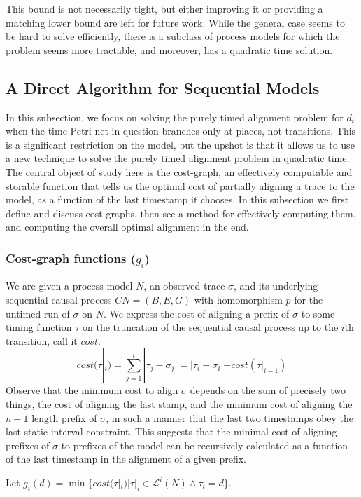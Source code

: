\documentclass[conference]{IEEEtran}
\begin{document}
		This bound is not necessarily tight, but either improving it or providing a matching lower bound are left for future work. 
		While the general case seems to be hard to solve efficiently, there is a subclass of process models for which the problem seems more tractable, and moreover, has a quadratic time solution. 
		

		\subsection{A Direct Algorithm for Sequential Models}\label{mcg}
		In this subsection, we focus on solving the purely timed alignment problem for $d_t$ when the time Petri net in question branches only at places, not transitions. 
		This is a significant restriction on the model, but the upshot is that it allows us to use a new technique to solve the purely timed alignment problem in quadratic time. 
		The central object of study here is the cost-graph, an effectively computable and storable function that tells us the optimal cost of partially aligning a trace to the model, as a function of the last timestamp it chooses. 
		In this subsection we first define and discuss cost-graphs, then see a method for effectively computing them, and computing the overall optimal alignment in the end. 

		\subsubsection{Cost-graph functions ($g_i$)}
		We are given a process model $N$, an observed trace $\sigma$, and its underlying sequential causal process $CN = (B, E, G)$ with homomorphism $p$ for the untimed run of $\sigma$ on $N$. 
		We express the cost of aligning a prefix of $\sigma$ to some timing function $\tau$ on the truncation of the sequential causal process up to the $i$th transition, call it $cost$. 
		$$cost(\tau|_i) = \sum_{j = 1}^{i} |\tau_j - \sigma_j| = |\tau_i - \sigma_i| + cost(\tau|_{i-1})$$
		Observe that the minimum cost to align $\sigma$ depends on the sum of precisely two things, the cost of aligning the last stamp, and the minimum cost of aligning the $n-1$ length prefix of $\sigma$, in such a manner that the last two timestamps obey the last static interval constraint.  
		This suggests that the minimal cost of aligning prefixes of $\sigma$ to prefixes of the model can be recursively calculated as a function of the last timestamp in the alignment of a given prefix. 
		
		Let $g_i(d) = \min\{cost(\tau|_i) | \tau|_i \in \mathcal{L}^i(N) \wedge \tau_i = d\} $. 
		
\end{document}

